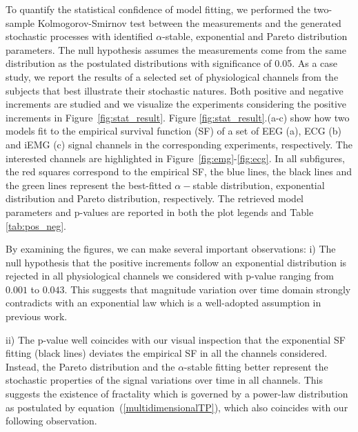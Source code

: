 To quantify the statistical confidence of model fitting, we performed the two-sample Kolmogorov-Smirnov test between the measurements and the generated stochastic processes with identified $\alpha$-stable, exponential and Pareto distribution parameters. The null hypothesis assumes the measurements come from the same distribution as the postulated distributions with significance of 0.05. As a case study, we report the results of a selected set of physiological channels from the subjects that best illustrate their stochastic natures. Both positive and negative increments are studied and we visualize the experiments considering the positive increments in Figure~\ref{fig:stat_result}. Figure \ref{fig:stat_result}.(a-c) show how two models fit to the empirical survival function (SF) of a set of EEG (a), ECG (b) and iEMG (c) signal channels in the corresponding experiments, respectively. The interested channels are highlighted in Figure~\ref{fig:emg}-\ref{fig:ecg}. In all subfigures, the red squares correspond to the empirical SF, the blue lines, the black lines and the green lines represent the best-fitted $\alpha-$stable distribution, exponential distribution and Pareto distribution, respectively. The retrieved model parameters and p-values are reported in both the plot legends and Table \ref{tab:pos_neg}. 

By examining the figures, we can make several important observations: i) The null hypothesis that the positive increments follow an exponential distribution is rejected in all physiological channels we considered with p-value ranging from $0.001$ to $0.043$. This suggests that magnitude variation over time domain strongly contradicts with an exponential law which is a well-adopted assumption in previous work. 

ii) The p-value well coincides with our visual inspection that the exponential SF fitting (black lines) deviates the empirical SF in all the channels considered. Instead, the Pareto distribution and the $\alpha$-stable fitting better represent the stochastic properties of the signal variations over time in all channels. This suggests the existence of fractality which is governed by a power-law distribution as postulated by equation~(\ref{multidimensionalTP}), which also coincides with our following observation.

